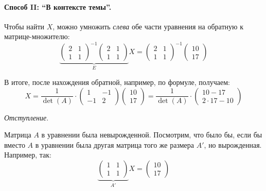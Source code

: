 \documentclass[a4paper,12pt]{article}
\begin{document}
\begin{solution}
    
    \medskip
    
    \paragraph{Способ II: ``В контексте темы''.}

    Чтобы найти $X$, можно умножить \emph{слева} обе части уравнения на обратную к матрице-множителю:
    \[
    \underbrace{\begin{pmatrix}
      2 & 1\\
      1 & 1
    \end{pmatrix}^{-1}
    \begin{pmatrix}
      2 & 1\\
      1 & 1
    \end{pmatrix}}_{E} X = \begin{pmatrix}
      2 & 1\\
      1 & 1
    \end{pmatrix}^{-1}
    \begin{pmatrix}
      10\\
      17
    \end{pmatrix}
  \]
  
  В итоге, после нахождения обратной, например, по формуле, получаем:
  \[
    X = \frac{1}{\det(A)} \cdot \begin{pmatrix}
      1 & -1\\
      -1 & 2
    \end{pmatrix}
    \begin{pmatrix}
      10\\
      17
    \end{pmatrix}
    = \frac{1}{\det(A)} \cdot \begin{pmatrix}
      10 - 17\\
      2 \cdot 17 - 10
    \end{pmatrix}
  \]
  \end{solution}
  
  
  \medskip
  
  \emph{Отступление}.
  
  Матрица $A$ в уравнении была невырожденной.
  Посмотрим, что было бы, если бы вместо $A$ в уравнении была другая матрица того же размера $A'$, но вырожденная.
  Например, так:
  \begin{equation}\label{eq:degenerate1}
    \underbrace{\begin{pmatrix}
      1 & 1\\
      1 & 1
    \end{pmatrix}}_{A'} X = \begin{pmatrix}
      10\\
      17
    \end{pmatrix}
  \end{equation}
  
\end{document}
